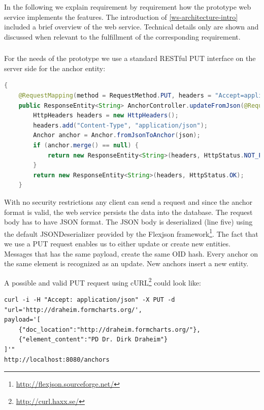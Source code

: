 In the following we explain requirement by requirement how the prototype web service implements the features. The introduction of \ref{ws-architecture-intro} included a brief overview of the web service. Technical details only are shown and discussed when relevant to the fulfillment of the corresponding requirement.

\subsubsection[Incoming Messages]{\reqWSi}

For the needs of the prototype we use a standard RESTful PUT interface on the server side for the anchor entity:

\begin{lstlisting}[language=Java]
{
    @RequestMapping(method = RequestMethod.PUT, headers = "Accept=application/json")
    public ResponseEntity<String> AnchorController.updateFromJson(@RequestBody String json) {
        HttpHeaders headers = new HttpHeaders();
        headers.add("Content-Type", "application/json");
        Anchor anchor = Anchor.fromJsonToAnchor(json);
        if (anchor.merge() == null) {
            return new ResponseEntity<String>(headers, HttpStatus.NOT_FOUND);
        }
        return new ResponseEntity<String>(headers, HttpStatus.OK);
    }
\end{lstlisting}

With no security restrictions any client can send a request and since the anchor format is valid, the web service persists the data into the database. The request body has to have JSON format. The JSON body is deserialized (line five) using the default JSONDeserializer provided by the Flexjson framework\footnote{\url{http://flexjson.sourceforge.net/}}. The fact that we use a PUT request enables us to either update or create new entities. Messages that has the same payload, create the same OID hash. Every anchor on the same element is recognized as an update. New anchors insert a new entity. 

A possible and valid PUT request using cURL\footnote{\url{http://curl.haxx.se/}} could look like:

\begin{verbatim}
curl -i -H "Accept: application/json" -X PUT -d 
"url='http://draheim.formcharts.org/', 
payload='[
	{"doc_location":"http://draheim.formcharts.org/"},
	{"element_content":"PD Dr. Dirk Draheim"}
]'"  
http://localhost:8080/anchors
\end{verbatim}

